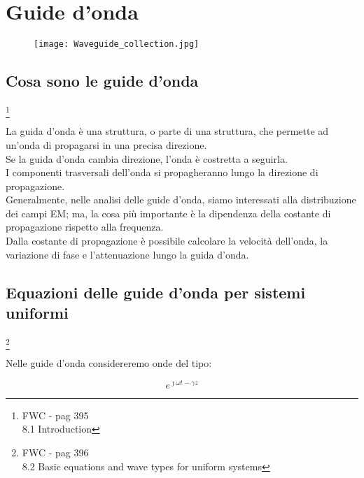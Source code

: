 \chapter{Guide d'onda} 

\begin{figure}[h]
    \centering
    \texttt{[image: Waveguide\_collection.jpg]}
\end{figure} 

\newpage 

\section{Cosa sono le guide d'onda} 

\footnote{FWC - pag 395 \\ 8.1 Introduction}

La guida d'onda è una struttura, o parte di una struttura, che permette 
ad un'onda di propagarsi in una precisa direzione. \\ 

Se la guida d'onda cambia direzione, l'onda è costretta a seguirla. \\ 

I componenti trasversali dell'onda si propagheranno lungo la direzione di propagazione. \\ 

Generalmente, nelle analisi delle guide d'onda, siamo interessati alla distribuzione dei campi EM; 
ma, la cosa più importante è la dipendenza della costante di propagazione rispetto alla frequenza. \\ 

Dalla costante di propagazione è possibile calcolare la velocità dell'onda, 
la variazione di fase e l'attenuazione lungo la guida d'onda. \\ 

\newpage 

\section{Equazioni delle guide d'onda per sistemi uniformi} 
\footnote{FWC - pag 396 \\ 8.2 Basic equations and wave types for uniform systems}

Nelle guide d'onda considereremo onde del tipo: 

{\Large 
    \begin{equation}
        e^{\jmath \omega t - \gamma z}
    \end{equation}
}

